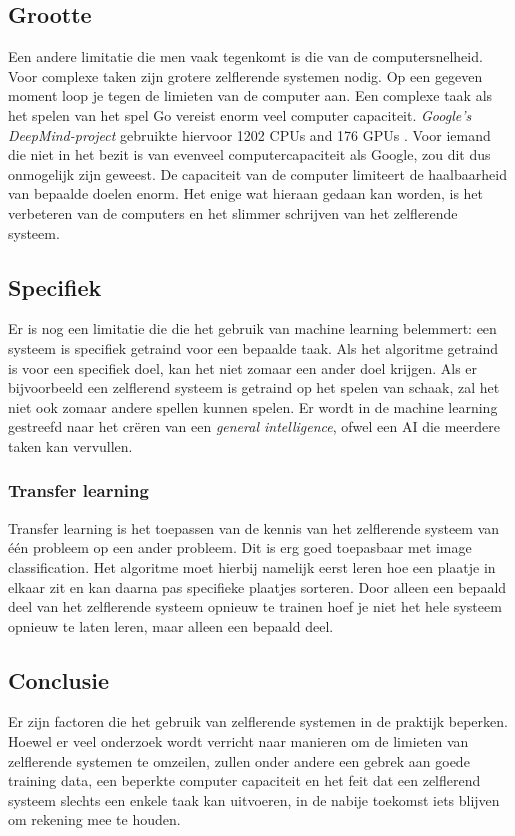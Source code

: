 \subsection{Grootte}
Een andere limitatie die men vaak tegenkomt is die van de computersnelheid. Voor complexe taken zijn grotere zelflerende systemen nodig. Op een gegeven moment loop je tegen de limieten van de computer aan. Een complexe taak als het spelen van het spel Go vereist enorm veel computer capaciteit. \textit{Google's DeepMind-project} gebruikte hiervoor 1202 CPUs and 176 GPUs \cite{GoogleDeepMindArticle}. Voor iemand die niet in het bezit is van evenveel computercapaciteit als Google, zou dit dus onmogelijk zijn geweest. De capaciteit van de computer limiteert de haalbaarheid van bepaalde doelen enorm. Het enige wat hieraan gedaan kan worden, is het verbeteren van de computers en het slimmer schrijven van het zelflerende systeem.

\subsection{Specifiek}
Er is nog een limitatie die die het gebruik van machine learning belemmert: een systeem is specifiek getraind voor een bepaalde taak.  Als het algoritme getraind is voor een specifiek doel, kan het niet zomaar een ander doel krijgen. Als er bijvoorbeeld een zelflerend systeem is getraind op het spelen van schaak, zal het niet ook zomaar andere spellen kunnen spelen. Er wordt in de machine learning gestreefd naar het cr\"eren van een \textit{general intelligence}, ofwel een AI die meerdere taken kan vervullen. 

\subsubsection{Transfer learning}
Transfer learning is het toepassen van de kennis van het zelflerende systeem van \'{e}\'{e}n probleem op een ander probleem. Dit is erg goed toepasbaar met image classification. Het algoritme moet hierbij namelijk eerst leren hoe een plaatje in elkaar zit en kan daarna pas specifieke plaatjes sorteren. Door alleen een bepaald deel van het zelflerende systeem opnieuw te trainen hoef je niet het hele systeem opnieuw te laten leren, maar alleen een bepaald deel. 

\subsection{Conclusie}
Er zijn factoren die het gebruik van zelflerende systemen in de praktijk beperken. Hoewel er veel onderzoek wordt verricht naar manieren om de limieten van zelflerende systemen te omzeilen, zullen onder andere een gebrek aan goede training data, een beperkte computer capaciteit en het feit dat een zelflerend systeem slechts een enkele taak kan uitvoeren, in de nabije toekomst iets blijven om rekening mee te houden.
